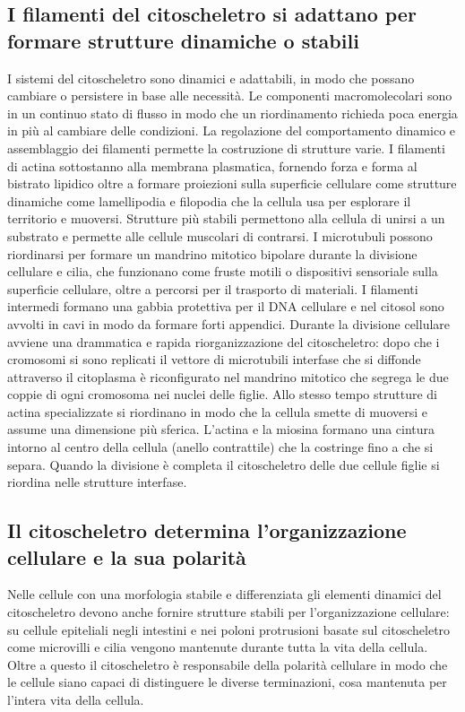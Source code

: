 \subsection{I filamenti del citoscheletro si adattano per formare strutture dinamiche o stabili}
I sistemi del citoscheletro sono dinamici e adattabili, in modo che possano cambiare o persistere in base alle necessit\`a. Le componenti macromolecolari sono in un continuo stato di 
flusso in modo che un riordinamento richieda poca energia in pi\`u al cambiare delle condizioni. La regolazione del comportamento dinamico e assemblaggio dei filamenti permette la
costruzione di strutture varie. I filamenti di actina sottostanno alla membrana plasmatica, fornendo forza e forma al bistrato lipidico oltre a formare proiezioni sulla superficie
cellulare come strutture dinamiche come lamellipodia e filopodia che la cellula usa per esplorare il territorio e muoversi. Strutture pi\`u stabili permettono alla cellula di unirsi
a un substrato e permette alle cellule muscolari di contrarsi. I microtubuli possono riordinarsi per formare un mandrino mitotico bipolare durante la divisione cellulare e cilia, che
funzionano come fruste motili o dispositivi sensoriale sulla superficie cellulare, oltre a percorsi per il trasporto di materiali. I filamenti intermedi formano una gabbia protettiva per
il DNA cellulare e nel citosol sono avvolti in cavi in modo da formare forti appendici. Durante la divisione cellulare avviene una drammatica e rapida riorganizzazione del citoscheletro:
dopo che i cromosomi si sono replicati il vettore di microtubili interfase che si diffonde attraverso il citoplasma \`e riconfigurato nel mandrino mitotico che segrega le due coppie di 
ogni cromosoma nei nuclei delle figlie. Allo stesso tempo strutture di actina specializzate si riordinano in modo che la cellula smette di muoversi e assume una dimensione pi\`u sferica.
L'actina e la miosina formano una cintura intorno al centro della cellula (anello contrattile) che la costringe fino a che si separa. Quando la divisione \`e completa il citoscheletro 
delle due cellule figlie si riordina nelle strutture interfase. 
\subsection{Il citoscheletro determina l'organizzazione cellulare e la sua polarit\`a}
Nelle cellule con una morfologia stabile e differenziata gli elementi dinamici del citoscheletro devono anche fornire strutture stabili per l'organizzazione cellulare: su cellule 
epiteliali negli intestini e nei poloni protrusioni basate sul citoscheletro come microvilli e cilia vengono mantenute durante tutta la vita della cellula. Oltre a questo il 
citoscheletro \`e responsabile della polarit\`a cellulare in modo che le cellule siano capaci di distinguere le diverse terminazioni, cosa mantenuta per l'intera vita della cellula. 
